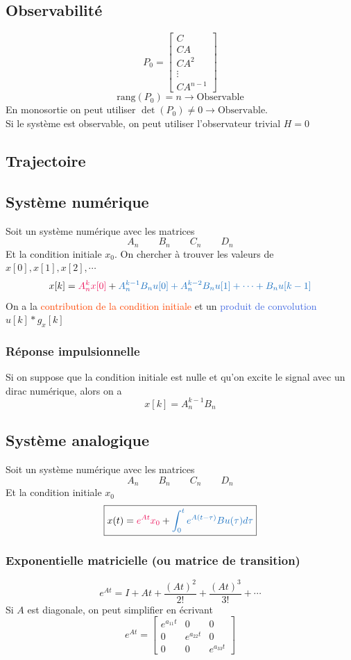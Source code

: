 \documentclass[resume]{subfiles}
\begin{document}
\subsection{Observabilité}
$$\boxed{P_0=\begin{bmatrix}C\\CA\\CA^2\\\vdots\\CA^{n-1}\end{bmatrix}}$$
$$\boxed{\text{rang}(P_0)=n\longrightarrow\text{Observable}}$$
En monosortie on peut utiliser $\det(P_0)\neq 0\longrightarrow \text{Observable}$.\\
Si le système est observable, on peut utiliser l'observateur trivial $H=0$
\subsection{Trajectoire}
\subsection{Système numérique}
Soit un système numérique avec les matrices
$$A_n\qquad B_n\qquad C_n\qquad D_n$$
Et la condition initiale $x_0$. On chercher à trouver les valeurs de $x[0],x[1],x[2],\cdots$
$$x[k]=\textcolor{OrangeRed}{A_n^kx[0]}+\textcolor{RoyalBlue}{A_n^{k-1}B_nu[0]+A_n^{k-2}B_nu[1]+\cdots +B_nu[k-1]}$$
On a la \textcolor{OrangeRed}{contribution de la condition initiale} et un \textcolor{RoyalBlue}{produit de convolution} $u[k]\ast g_x[k]$
\subsubsection{Réponse impulsionnelle}
Si on suppose que la condition initiale est nulle et qu'on excite le signal avec un dirac numérique, alors on a
$$\boxed{x[k]=A_n^{k-1}B_n}$$
\subsection{Système analogique}
Soit un système numérique avec les matrices
$$A_n\qquad B_n\qquad C_n\qquad D_n$$
Et la condition initiale $x_0$
$$\boxed{x(t)=\textcolor{OrangeRed}{e^{At}x_0}+\textcolor{RoyalBlue}{\int_{0}^{t}e^{A(t-\tau)}Bu(\tau)d\tau}}$$
\subsubsection{Exponentielle matricielle (ou matrice de transition)}
$$\boxed{e^{At}=I+At+\frac{(At)^2}{2!}+\frac{(At)^3}{3!}+\cdots}$$
Si $A$ est diagonale, on peut simplifier en écrivant
$$e^{At}=\begin{bmatrix}e^{a_{11}t} & 0 & 0\\0 & e^{a_{22}t} & 0\\0 & 0 & e^{a_{33}t}\end{bmatrix}$$
\end{document}
